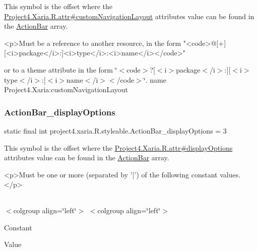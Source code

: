 This symbol is the offset where the \hyperlink{}{Project4.\+Xaria.\+R.\+attr\#custom\+Navigation\+Layout} attribute\textquotesingle{}s value can be found in the \hyperlink{classproject4_1_1xaria_1_1R_1_1styleable_accb530194c58ee3abb15587da8869e99}{Action\+Bar} array.

\begin{DoxyVerb}      <p>Must be a reference to another resource, in the form "<code>@[+][<i>package</i>:]<i>type</i>:<i>name</i></code>"
\end{DoxyVerb}
 or to a theme attribute in the form \char`\"{}$<$code$>$?\mbox{[}$<$i$>$package$<$/i$>$\+:\mbox{]}\mbox{[}$<$i$>$type$<$/i$>$\+:\mbox{]}$<$i$>$name$<$/i$>$$<$/code$>$\char`\"{}.  name Project4.\+Xaria\+:custom\+Navigation\+Layout \mbox{\label{classproject4_1_1xaria_1_1R_1_1styleable_a656add89aebf98d754b0482202026647}} 
\subsubsection{\texorpdfstring{Action\+Bar\+\_\+display\+Options}{ActionBar\_displayOptions}}
{\footnotesize\ttfamily static final int project4.\+xaria.\+R.\+styleable.\+Action\+Bar\+\_\+display\+Options = 3\hspace{0.3cm}{\ttfamily [static]}}

This symbol is the offset where the \hyperlink{}{Project4.\+Xaria.\+R.\+attr\#display\+Options} attribute\textquotesingle{}s value can be found in the \hyperlink{classproject4_1_1xaria_1_1R_1_1styleable_accb530194c58ee3abb15587da8869e99}{Action\+Bar} array.

\begin{DoxyVerb}      <p>Must be one or more (separated by '|') of the following constant values.</p>
\end{DoxyVerb}
 \tabulinesep=1mm
\begin{longtabu} spread 0pt [c]{*{0}{|X[-1]}|}
\hline
\end{longtabu}
$<$colgroup align=\char`\"{}left\char`\"{}$>$ $<$colgroup align=\char`\"{}left\char`\"{}$>$ 

Constant

Value

